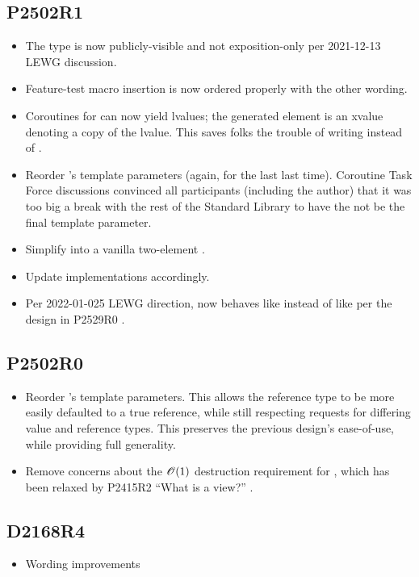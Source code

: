 \documentclass{wg21}
\begin{document}
\subsection{P2502R1}
\begin{itemize}
\item The type 
  is now publicly-visible and not exposition-only
  per 2021-12-13 LEWG discussion.
\item Feature-test macro insertion is now
  ordered properly with the other wording.
\item Coroutines for  can now yield lvalues;
  the generated element is an xvalue denoting a copy of the lvalue.
  This saves folks the trouble of writing 
  instead of .
\item Reorder 's template parameters
  (again, for the last last time).
  Coroutine Task Force discussions convinced all participants
  (including the author) that it was too big a break with
  the rest of the Standard Library to have the  not be
  the final template parameter.
\item Simplify  into a vanilla two-element .
\item Update implementations accordingly.
\item Per 2022-01-025 LEWG direction, 
  now behaves like 
  instead of like 
  per the design in P2529R0 \cite{P2529R0}.
\end{itemize}

\subsection{P2502R0}
\begin{itemize}
\item Reorder 's template parameters.
  This allows the reference type to be
  more easily defaulted to a true reference,
  while still respecting requests for
  differing value and reference types.
  This preserves the previous design's ease-of-use,
  while providing full generality.
\item Remove concerns about the $\mathscr{O}(1)$ destruction requirement for ,
  which has been relaxed by P2415R2 ``What is a view?'' \cite{P2415R2}.
\end{itemize}

\subsection{D2168R4}
\begin{itemize}
\item Wording improvements
\end{itemize}
\end{document}

